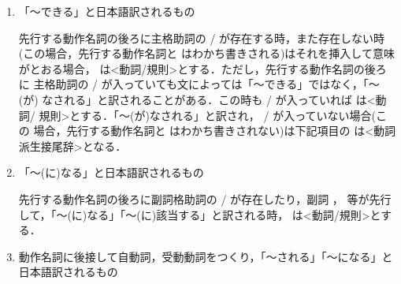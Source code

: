 \begin{itemize}
\begin{enumerate}
\item 「〜できる」と日本語訳されるもの
\vspace{\baselineskip}


先行する動作名詞の後ろに主格助詞の
/
が存在する時，また存在しない時
(この場合，先行する動作名詞と
はわかち書きされる)はそれを挿入して意味
がとおる場合，
は<動詞/規則>とする．ただし，先行する動作名詞の後ろに
主格助詞の
/
が入っていても文によっては「〜できる」ではなく，「〜(が)
なされる」と訳されることがある．この時も
/
が入っていれば 
は<動詞/
規則>とする．「〜(が)なされる」と訳され，
/
が入っていない場合(この
場合，先行する動作名詞と
はわかち書きされない)は下記項目の
は<動詞派生接尾辞>となる．

\item 「〜(に)なる」と日本語訳されるもの
\vspace{\baselineskip}


先行する動作名詞の後ろに副詞格助詞の
/
が存在したり，副詞
，
等が先行して，「〜(に)なる」「〜(に)該当する」と訳される時，
は<動詞/規則>とする．


\item
動作名詞に後接して自動詞，受動動詞をつくり，「〜される」「〜になる」と
日本語訳されるもの
\vspace{\baselineskip}


\end{enumerate}
\end{itemize}
